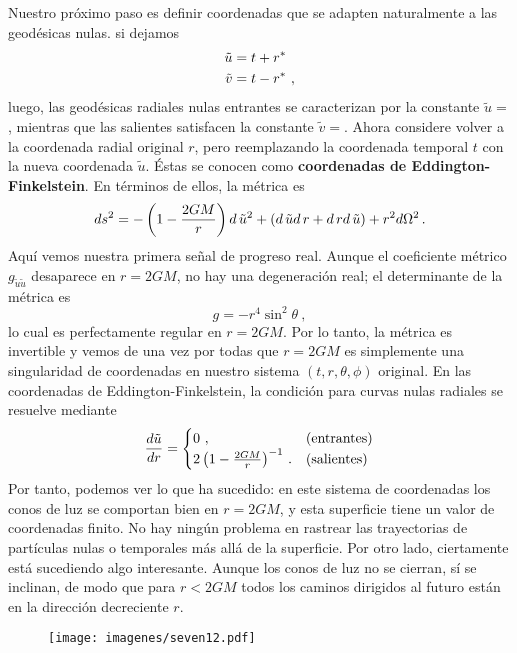 \documentclass[11pt,b5paper,openany,twoside]{book}
\begin{document}
Nuestro próximo paso es definir coordenadas que se adapten naturalmente a las geodésicas nulas.
si dejamos
\begin{align}
\tilde u  &=  t+r^* \notag \\  \tilde v  &=  t-r^*\ ,\label{7.68}
\end{align}
luego, las geodésicas radiales nulas entrantes se caracterizan por la constante $\tilde u = $, mientras que las salientes satisfacen la constante $\tilde v = $.
Ahora considere volver a la coordenada radial original $r$, pero reemplazando la coordenada temporal $t$ con la nueva coordenada $\tilde u$.
Éstas se conocen como {\bf coordenadas de Eddington-Finkelstein}.
En términos de ellos, la métrica es
\begin{equation}
ds^2 = -\left(1-{{2GM}\over r}\right) d\,{\tilde u}^2 +
( d\,\tilde u  d\,r +  d\,r d\,\tilde u) + r^2 d\Omega^2\,.\label{7.69}
\end{equation}
Aquí vemos nuestra primera señal de progreso real.
Aunque el coeficiente métrico $g_{\tilde u \tilde u}$ desaparece en $r=2GM$, no hay una degeneración real; el determinante de la métrica es
\begin{equation}
g = -r^4 \sin^2\theta\ ,\label{7.70}
\end{equation}
lo cual es perfectamente regular en $r=2GM$.
Por lo tanto, la métrica es invertible y vemos de una vez por todas que $r=2GM$ es simplemente una singularidad de coordenadas en nuestro sistema $(t,r,\theta,\phi)$ original.
En las coordenadas de Eddington-Finkelstein, la condición para curvas nulas radiales se resuelve mediante
\begin{equation}
{{d\tilde u}\over {dr}} =
\begin{cases}
0\ ,& {\rm (entrantes)} \\
2\left(1-{{2GM}\over r}\right)^{-1}\,.& {\rm (salientes)}
\end{cases}
\label{7.71}
\end{equation}
Por tanto, podemos ver lo que ha sucedido: en este sistema de coordenadas los conos de luz se comportan bien en $r=2GM$, y esta superficie tiene un valor de coordenadas finito.
No hay ningún problema en rastrear las trayectorias de partículas nulas o temporales más allá de la superficie.
Por otro lado, ciertamente está sucediendo algo interesante.
Aunque los conos de luz no se cierran, sí se inclinan, de modo que para $r< 2GM$ todos los caminos dirigidos al futuro están en la dirección decreciente $r$.

\begin{figure}[h]
\centering
\texttt{[image: imagenes/seven12.pdf]}
\end{figure}
\end{document}
